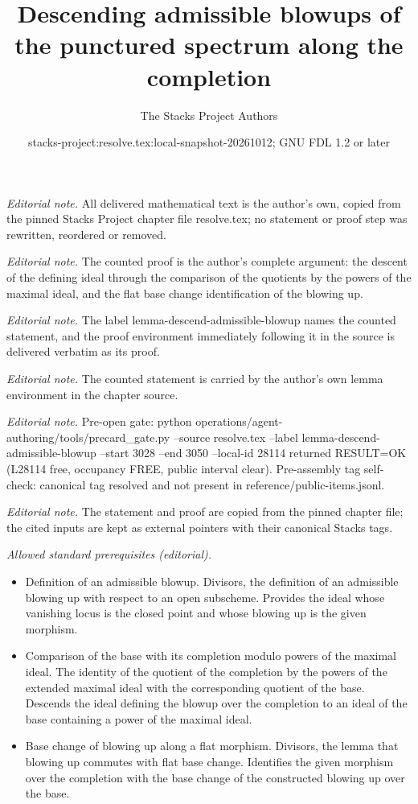 \documentclass[10pt,a4paper]{amsart}
\title{Descending admissible blowups of the punctured spectrum along the completion}
\author{The Stacks Project Authors}
\date{stacks-project:resolve.tex:local-snapshot-20261012; GNU FDL 1.2 or later}
\theoremstyle{plain}
\theoremstyle{definition}
\theoremstyle{remark}
\numberwithin{equation}{subsection}
\begin{document}
\maketitle
\noindent\textit{Editorial note.} All delivered mathematical text is the author's own, copied from the pinned Stacks Project chapter file resolve.tex; no statement or proof step was rewritten, reordered or removed.\par\medskip
\noindent\textit{Editorial note.} The counted proof is the author's complete argument: the descent of the defining ideal through the comparison of the quotients by the powers of the maximal ideal, and the flat base change identification of the blowing up.\par\medskip
\noindent\textit{Editorial note.} The label lemma-descend-admissible-blowup names the counted statement, and the proof environment immediately following it in the source is delivered verbatim as its proof.\par\medskip
\noindent\textit{Editorial note.} The counted statement is carried by the author's own lemma environment in the chapter source.\par\medskip
\noindent\textit{Editorial note.} Pre-open gate: python operations/agent-authoring/tools/precard\_gate.py --source resolve.tex --label lemma-descend-admissible-blowup --start 3028 --end 3050 --local-id 28114 returned RESULT=OK (L28114 free, occupancy FREE, public interval clear). Pre-assembly tag self-check: canonical tag resolved and not present in reference/public-items.jsonl.\par\medskip
\noindent\textit{Editorial note.} The statement and proof are copied from the pinned chapter file; the cited inputs are kept as external pointers with their canonical Stacks tags.\par\medskip
\noindent\textit{Allowed standard prerequisites (editorial).}\begin{itemize}
\item Definition of an admissible blowup. Divisors, the definition of an admissible blowing up with respect to an open subscheme. Provides the ideal whose vanishing locus is the closed point and whose blowing up is the given morphism.
\item Comparison of the base with its completion modulo powers of the maximal ideal. The identity of the quotient of the completion by the powers of the extended maximal ideal with the corresponding quotient of the base. Descends the ideal defining the blowup over the completion to an ideal of the base containing a power of the maximal ideal.
\item Base change of blowing up along a flat morphism. Divisors, the lemma that blowing up commutes with flat base change. Identifies the given morphism over the completion with the base change of the constructed blowing up over the base.
\end{itemize}\medskip
\end{document}
